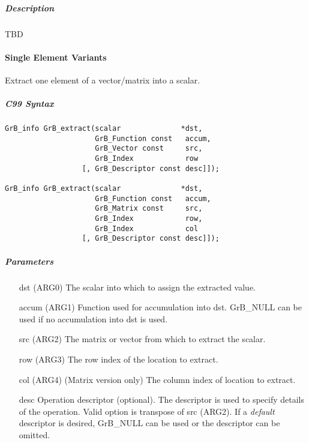 \subparagraph{Description}

TBD

\paragraph{Single Element Variants}

Extract one element of a vector/matrix into a scalar.  



\subparagraph{C99 Syntax}

\begin{verbatim}
GrB_info GrB_extract(scalar              *dst, 
                     GrB_Function const   accum,
                     GrB_Vector const     src,
                     GrB_Index            row
                  [, GrB_Descriptor const desc]]);

GrB_info GrB_extract(scalar              *dst,
                     GrB_Function const   accum,
                     GrB_Matrix const     src,
                     GrB_Index            row,
                     GrB_Index            col
                  [, GrB_Descriptor const desc]]);

\end{verbatim}

\subparagraph{Parameters}

\begin{itemize}[leftmargin=1in]
	\item[{\sf dst (ARG0)}]   The scalar into which to assign the extracted value.
	\item[{\sf accum (ARG1)}] Function used for accumulation into dst.  {\sf GrB\_NULL}
                              can be used if no accumulation into dst is used.
	\item[{\sf src (ARG2)}]   The matrix or vector from which to extract the scalar.
	\item[{\sf row (ARG3)}]   The row index of the location to extract.
	\item[{\sf col (ARG4)}]   (Matrix version only) The column index of location to extract.
    \item[{\sf desc}]         Operation descriptor (optional). The descriptor
                              is used to specify details of the operation. Valid option is
                              transpose of src ({\sf ARG2}). If a \emph{default} descriptor
                              is desired,	{\sf GrB\_NULL} can be used or the descriptor
                              can be omitted.  
\end{itemize}

